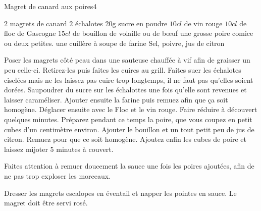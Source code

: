 \begin{recette}{Magret de canard aux poires}{4}{}{}
\begin{ingredients}
\ingredient $2$ magrets de canard
\ingredient $2$ échalotes
\ingredient 20g sucre en poudre
\ingredient  $10 \unit{cl}$ de vin rouge
\ingredient  $10 \unit{cl}$ de floc de Gascogne
\ingredient  $15 \unit{cl}$ de bouillon de volaille ou de bœuf
\ingredient  une grosse poire comice ou deux petites.
\ingredient une cuillère à soupe de farine
\ingredient  Sel, poivre, jus de citron

\end{ingredients}

\begin{preparation}
\etape Poser les magrets côté peau dans une sauteuse chauffée à vif afin de graisser un peu celle-ci. Retirez-les puis faites les cuires au grill.
\etape Faites suer les échalotes ciselées mais ne les laissez pas cuire trop longtemps, il ne faut pas qu'elles soient dorées. 
\etape Saupoudrer du sucre sur les échalottes une fois qu'elle sont revenues et laisser caraméliser. 
\etape Ajouter ensuite la farine puis remuez afin que ça soit homogène.
\etape Déglacer ensuite avec le Floc et le vin rouge. 
\etape Faire réduire à découvert quelques minutes. Préparez pendant ce temps la poire, que vous coupez en petit cubes d'un centimètre environ.
\etape Ajouter le bouillon et un tout petit peu de jus de citron. Remuez pour que ce soit homogène. Ajoutez enfin les cubes de poire et laissez mijoter 5 minutes à couvert.
\begin{remarque}
Faites attention à remuer doucement la sauce une fois les poires ajoutées, afin de ne pas trop exploser les morceaux.
\end{remarque}
\etape Dresser les magrets escalopes en éventail et napper les pointes en sauce.
\etape Le magret doit être servi rosé.
\end{preparation}

\end{recette}

